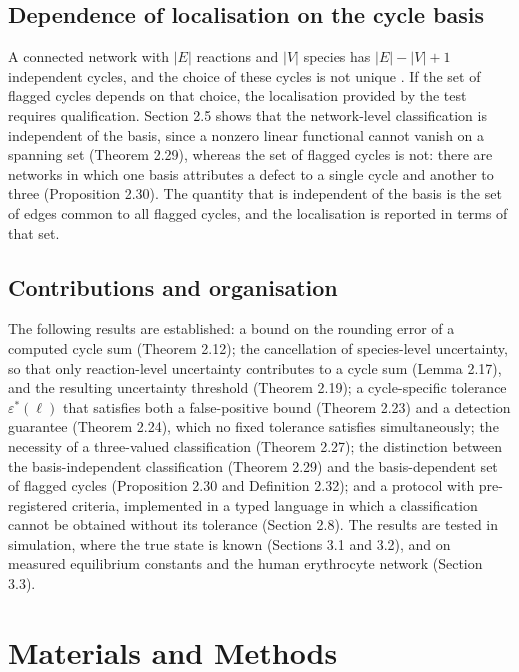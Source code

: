 \documentclass[11pt,a4paper]{article}
\theoremstyle{pstyle}
\theoremstyle{definition}
\theoremstyle{remark}
\newcommand{\abs}[1]{\lvert#1\rvert}
\newcommand{\eps}{\varepsilon}
\newcommand{\epsstar}{\eps^{\ast}}
\begin{document}
\subsection{Dependence of localisation on the cycle basis}

A connected network with $\abs{E}$ reactions and $\abs{V}$ species has
$\abs{E}-\abs{V}+1$ independent cycles, and the choice of these cycles
is not unique \citep{kavitha2009,diestel2017}. If the set of flagged
cycles depends on that choice, the localisation provided by the test
requires qualification. Section 2.5 shows that the network-level
classification is independent of the basis, since a nonzero linear
functional cannot vanish on a spanning set (Theorem 2.29),
whereas the set of flagged cycles is not: there are networks in which
one basis attributes a defect to a single cycle and another to three
(Proposition 2.30). The quantity that is independent of
the basis is the set of edges common to all flagged cycles, and the
localisation is reported in terms of that set.

\subsection{Contributions and organisation}

The following results are established: a bound on the rounding error of
a computed cycle sum (Theorem 2.12); the cancellation of
species-level uncertainty, so that only reaction-level uncertainty
contributes to a cycle sum (Lemma 2.17), and the
resulting uncertainty threshold (Theorem 2.19); a
cycle-specific tolerance $\epsstar(\ell)$ that satisfies both a
false-positive bound (Theorem 2.23) and a detection
guarantee (Theorem 2.24), which no fixed tolerance satisfies
simultaneously; the necessity of a three-valued classification
(Theorem 2.27); the distinction between the basis-independent
classification (Theorem 2.29) and the basis-dependent set of
flagged cycles (Proposition 2.30 and Definition 2.32); and a
protocol with pre-registered criteria, implemented in a typed language
in which a classification cannot be obtained without its tolerance
(Section 2.8). The results are tested in simulation, where the
true state is known (Sections 3.1 and 3.2),
and on measured equilibrium constants and the human erythrocyte network
(Section 3.3).

\section{Materials and Methods}
\label{sec:methods}
\end{document}
